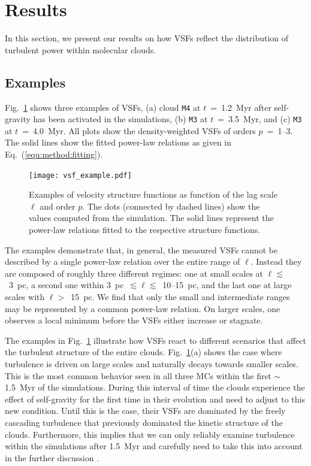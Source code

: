 \section{Results}\label{results}

In this section, we present our results on how VSFs reflect the distribution of turbulent power within molecular clouds.

\subsection{Examples}\label{results:example}

Fig.~\ref{pic:results:vsf_example} shows three examples of VSFs, (a) cloud \texttt{M4} at $t$~=~1.2~Myr after self-gravity has been activated in the simulations, (b) \texttt{M3} at $t$~=~3.5~Myr, and (c) \texttt{M3} at $t$~=~4.0~Myr.
All plots show the density-weighted VSFs of orders $p$~=~1--3.
The solid lines show the fitted power-law relations as given in Eq.~(\ref{equ:method:fitting}).

\begin{figure}[!htb]
	\centering
	\texttt{[image: vsf\_example.pdf]}
	\caption{Examples of velocity structure functions as function of the lag scale $\ell$ and order $p$. 
		The dots (connected by dashed lines) show the values computed from the simulation.
		The solid lines represent the power-law relations fitted to the respective structure functions.
	}
	\label{pic:results:vsf_example}
\end{figure}

The examples demonstrate that, in general, the measured VSFs cannot be described by a single power-law relation over the entire range of $\ell$.
Instead they are composed of roughly three different regimes: 
one at small scales at $\ell \lesssim$~3~pc, a second one within 3~pc~$\lesssim \ell \lesssim$~10--15~pc, and the last one at large scales with $\ell >$~15~pc.
We find that only the small and intermediate ranges may be represented by a common power-law relation.
On larger scales, one observes a local minimum before the VSFs either increase or stagnate.

The examples in Fig.~\ref{pic:results:vsf_example} illustrate how VSFs react to different scenarios that affect the turbulent structure of the entire clouds. 
Fig.~\ref{pic:results:vsf_example}(a) shows the case where turbulence is driven on large scales and naturally decays towards smaller scales.
This is the most common behavior seen in all three MCs within the first $\sim$1.5~Myr of the simulations.
During this interval of time the clouds experience the effect of self-gravity for the first time in their evolution and need to adjust to this new condition.
Until this is the case, their VSFs are dominated by the freely cascading turbulence that previously dominated the kinetic structure of the clouds.
Furthermore, this implies that we can only reliably examine turbulence within the simulations after 1.5~Myr and carefully need to take this into account in the further discussion \citep[see][]{IbanezMejia2017,Seifried2017b}.

